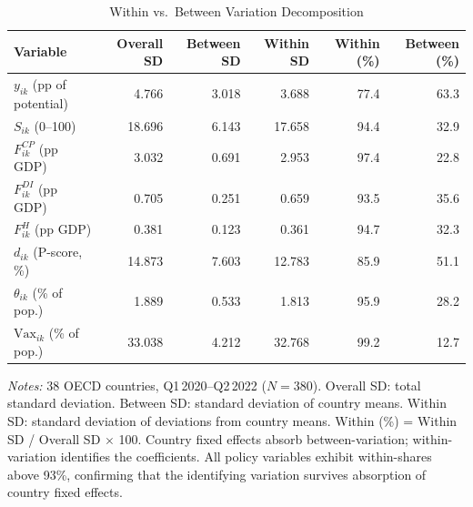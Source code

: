 \documentclass[12pt, a4paper]{article}
\begin{document}
\begin{table}[H]
\centering
\caption{Within vs.\ Between Variation Decomposition}
\label{tab:within_between}
\scriptsize
\renewcommand{\arraystretch}{1.15}
\begin{tabular}{@{} l r r r r r @{}}
\toprule
\textbf{Variable} & \textbf{Overall SD} & \textbf{Between SD} & \textbf{Within SD}
  & \textbf{Within (\%)} & \textbf{Between (\%)} \\
\midrule
$y_{ik}$ (pp of potential)       & 4.766 & 3.018 & 3.688 & 77.4 & 63.3 \\
$S_{ik}$ (0--100)                & 18.696 & 6.143 & 17.658 & 94.4 & 32.9 \\
$F^{CP}_{ik}$ (pp GDP)          & 3.032 & 0.691 & 2.953 & 97.4 & 22.8 \\
$F^{DI}_{ik}$ (pp GDP)          & 0.705 & 0.251 & 0.659 & 93.5 & 35.6 \\
$F^{H}_{ik}$ (pp GDP)           & 0.381 & 0.123 & 0.361 & 94.7 & 32.3 \\
$d_{ik}$ (P-score, \%)          & 14.873 & 7.603 & 12.783 & 85.9 & 51.1 \\
$\theta_{ik}$ (\% of pop.)      & 1.889 & 0.533 & 1.813 & 95.9 & 28.2 \\
$\text{Vax}_{ik}$ (\% of pop.)  & 33.038 & 4.212 & 32.768 & 99.2 & 12.7 \\
\bottomrule
\end{tabular}
\vspace{4pt}

\parbox{\textwidth}{\scriptsize\textit{Notes:} 38 OECD countries,
Q1\,2020--Q2\,2022 ($N = 380$). Overall SD: total standard deviation.
Between SD: standard deviation of country means. Within SD: standard
deviation of deviations from country means. Within (\%) = Within SD /
Overall SD $\times$ 100. Country fixed effects absorb between-variation;
within-variation identifies the coefficients. All policy variables
exhibit within-shares above 93\%, confirming that the identifying
variation survives absorption of country fixed effects.}
\end{table}
\end{document}
